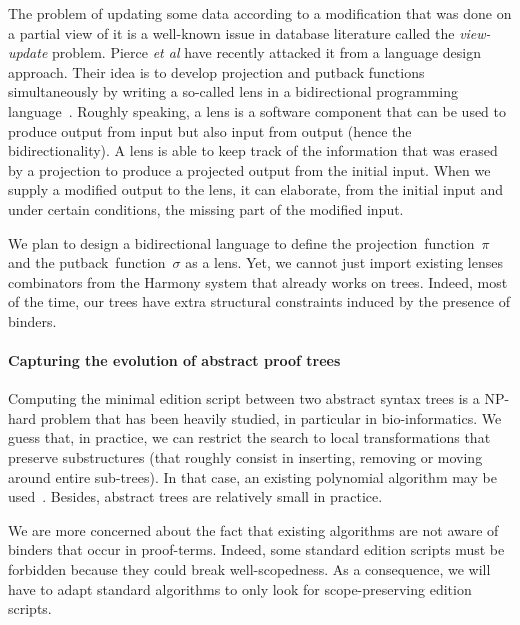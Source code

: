 The problem of updating some data according to a modification that was
done on a partial view of it is a well-known issue in database
literature called the \textit{view-update} problem. Pierce \textit{et
  al} have recently attacked it from a language design approach. Their
idea is to develop projection and putback functions simultaneously by
writing a so-called lens in a bidirectional programming
language~\cite{pierce-bidirectional}. Roughly speaking, a lens is a
software component that can be used to produce output from input but
also input from output (hence the bidirectionality). A lens is able
to keep track of the information that was erased by a projection to
produce a projected output from the initial input. When we supply a
modified output to the lens, it can elaborate, from the initial input
and under certain conditions, the missing part of the modified input. 

We plan to design a bidirectional language to define the
projection~function~$\pi$ and the putback~function~$\sigma$ as a
lens. Yet, we cannot just import existing lenses combinators from the
Harmony system that already works on trees. Indeed, most of the time,
our trees have extra structural constraints induced by the presence of
binders. 


\paragraph{Capturing the evolution of abstract proof trees}
\-

Computing the minimal edition script between two abstract syntax trees
is a NP-hard problem that has been heavily studied, in particular in
bio-informatics.  We guess that, in practice, we can restrict the
search to local transformations that preserve substructures (that
roughly consist in inserting, removing or moving around entire
sub-trees). In that case, an existing polynomial algorithm may be
used~\cite{Touzet05alinear}. Besides, abstract trees are relatively small in
practice. 

We are more concerned about the fact that existing algorithms are not
aware of binders that occur in proof-terms. Indeed, some standard
edition scripts must be forbidden because they could break
well-scopedness. As a consequence, we will have to adapt standard
algorithms to only look for scope-preserving edition scripts.

